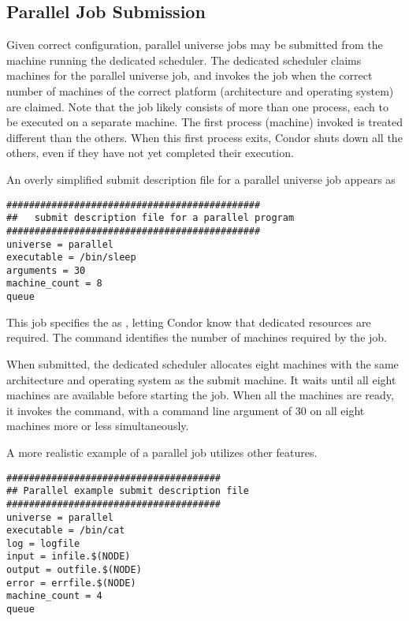 \subsection{\label{sec:parallel-submit}Parallel Job Submission}

Given correct configuration, parallel universe jobs may be submitted
from the machine running the dedicated scheduler.
The dedicated scheduler claims machines for the parallel universe job,
and invokes the job when the correct number of machines of the
correct platform (architecture and operating system) are claimed.
Note that the job likely consists of more than one process,
each to be executed on a separate machine.
The first process (machine) invoked is treated
different than the others.
When this first process exits, Condor shuts down all the others,
even if they have not yet completed their execution.

An overly simplified submit description file for a parallel universe
job appears as

\begin{verbatim}
#############################################
##   submit description file for a parallel program
#############################################
universe = parallel
executable = /bin/sleep
arguments = 30
machine_count = 8
queue 
\end{verbatim}

This job specifies the  as , letting
Condor know that dedicated resources are required.  The
 command identifies the number of machines
required by the job. 

When submitted, the dedicated scheduler allocates eight
machines with the same architecture and operating system as the submit
machine.  It waits until all eight machines are available before
starting the job.  When all the machines are ready, it invokes the
 command, with a command line argument of 30
on all eight machines more or less simultaneously.

A more realistic example of a parallel job utilizes other features.
\begin{verbatim}
######################################
## Parallel example submit description file
######################################
universe = parallel
executable = /bin/cat
log = logfile
input = infile.$(NODE)
output = outfile.$(NODE)
error = errfile.$(NODE)
machine_count = 4
queue
\end{verbatim}

